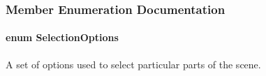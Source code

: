 \subsubsection{Member Enumeration Documentation}
\hypertarget{classOpenRAVE_1_1EnvironmentBase_a0abab749a8f5d8ff38d62672ae03abee}{
\paragraph[{SelectionOptions}]{\setlength{\rightskip}{0pt plus 5cm}enum {\bf SelectionOptions}}\hfill}
\label{classOpenRAVE_1_1EnvironmentBase_a0abab749a8f5d8ff38d62672ae03abee}


A set of options used to select particular parts of the scene. 

